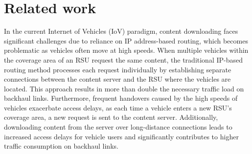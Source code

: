 \documentclass{aims}
\numberwithin{equation}{section}
\begin{document}
\section{Related work} \label{sec.rw}
In the current Internet of Vehicles (IoV) paradigm, content downloading faces significant challenges due to reliance on IP address-based routing, which becomes problematic as vehicles often move at high speeds. When multiple vehicles within the coverage area of an RSU request the same content, the traditional IP-based routing method processes each request individually by establishing separate connections between the content server and the RSU where the vehicles are located. This approach results in more than double the necessary traffic load on backhaul links. Furthermore, frequent handovers caused by the high speeds of vehicles exacerbate access delays, as each time a vehicle enters a new RSU's coverage area, a new request is sent to the content server. Additionally, downloading content from the server over long-distance connections leads to increased access delays for vehicle users and significantly contributes to higher traffic consumption on backhaul links.
\end{document}
